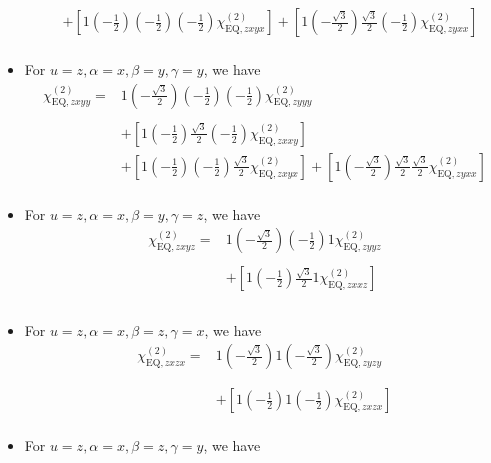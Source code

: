 \documentclass[UTF8,10pt,a4paper]{article}
\begin{document}
\begin{itemize}
\begin{align}
\nonumber&+\left[1\left(-\frac{1}{2}\right)\left(-\frac{1}{2}\right)\left(-\frac{1}{2}\right)\chi_{\text{EQ},zxyx}^{(2)}\right]+\left[1\left(-\frac{\sqrt{3}}{2}\right)\frac{\sqrt{3}}{2}\left(-\frac{1}{2}\right)\chi_{\text{EQ},zyxx}^{(2)}\right]\\
&
\end{align}\normalsize
\item For $u=z,\alpha=x,\beta=y,\gamma=y$, we have
\footnotesize\begin{align}
\nonumber\chi_{\text{EQ},zxyy}^{(2)}=&1\left(-\frac{\sqrt{3}}{2}\right)\left(-\frac{1}{2}\right)\left(-\frac{1}{2}\right)\chi_{\text{EQ},zyyy}^{(2)}\\
\nonumber&\\
\nonumber&+\left[1\left(-\frac{1}{2}\right)\frac{\sqrt{3}}{2}\left(-\frac{1}{2}\right)\chi_{\text{EQ},zxxy}^{(2)}\right]\\
\nonumber&+\left[1\left(-\frac{1}{2}\right)\left(-\frac{1}{2}\right)\frac{\sqrt{3}}{2}\chi_{\text{EQ},zxyx}^{(2)}\right]+\left[1\left(-\frac{\sqrt{3}}{2}\right)\frac{\sqrt{3}}{2}\frac{\sqrt{3}}{2}\chi_{\text{EQ},zyxx}^{(2)}\right]\\
&
\end{align}\normalsize
\item For $u=z,\alpha=x,\beta=y,\gamma=z$, we have
\footnotesize\begin{align}
\nonumber\chi_{\text{EQ},zxyz}^{(2)}=&1\left(-\frac{\sqrt{3}}{2}\right)\left(-\frac{1}{2}\right)1\chi_{\text{EQ},zyyz}^{(2)}\\
\nonumber&\\
\nonumber&+\left[1\left(-\frac{1}{2}\right)\frac{\sqrt{3}}{2}1\chi_{\text{EQ},zxxz}^{(2)}\right]\\
\nonumber&\\
&
\end{align}\normalsize
\item For $u=z,\alpha=x,\beta=z,\gamma=x$, we have
\footnotesize\begin{align}
\nonumber\chi_{\text{EQ},zxzx}^{(2)}=&1\left(-\frac{\sqrt{3}}{2}\right)1\left(-\frac{\sqrt{3}}{2}\right)\chi_{\text{EQ},zyzy}^{(2)}\\
\nonumber&\\
\nonumber&\\
\nonumber&+\left[1\left(-\frac{1}{2}\right)1\left(-\frac{1}{2}\right)\chi_{\text{EQ},zxzx}^{(2)}\right]\\
&
\end{align}\normalsize
\item For $u=z,\alpha=x,\beta=z,\gamma=y$, we have

\end{itemize}
\end{document}
